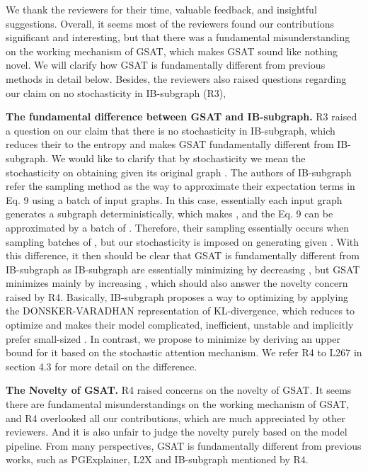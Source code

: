 \documentclass{article}
\begin{document}
\newpage
We thank the reviewers for their time, valuable feedback, and insightful suggestions. Overall, it seems most of the reviewers found our contributions significant and interesting, but that there was a fundamental misunderstanding on the working mechanism of GSAT, which makes GSAT sound like nothing novel. We will clarify how GSAT is fundamentally different from previous methods in detail below. Besides, the reviewers also raised questions regarding our claim on no stochasticity in IB-subgraph (R3), 

\textbf{The fundamental difference between GSAT and IB-subgraph.} R3 raised a question on our claim that there is no stochasticity in IB-subgraph, which reduces their  to the entropy  and makes GSAT fundamentally different from IB-subgraph. We would like to clarify that by stochasticity we mean the stochasticity on obtaining  given its original graph . The authors of IB-subgraph refer the sampling method as the way to approximate their expectation terms in Eq. 9 using a batch of input graphs. In this case, essentially each input graph   generates a subgraph  deterministically, which makes , and the Eq. 9 can be approximated by a batch of . Therefore, their sampling essentially occurs when sampling batches of , but our stochasticity is imposed on generating  given . With this difference, it then should be clear that GSAT is fundamentally different from IB-subgraph as IB-subgraph are essentially minimizing  by decreasing , but GSAT minimizes  mainly by increasing , which should also answer the novelty concern raised by R4. Basically, IB-subgraph proposes a way to optimizing  by applying the DONSKER-VARADHAN representation of KL-divergence, which reduces to optimize  and makes their model complicated, inefficient, unstable and implicitly prefer small-sized . In contrast, we propose to minimize  by deriving an upper bound for it based on the stochastic attention mechanism. We refer R4 to L267 in section 4.3 for more detail on the difference.

\textbf{The Novelty of GSAT.} R4 raised concerns on the novelty of GSAT. It seems there are fundamental misunderstandings on the working mechanism of GSAT, and R4 overlooked all our contributions, which are much appreciated by other reviewers. And it is also unfair to judge the novelty purely based on the model pipeline. From many perspectives, GSAT is fundamentally different from previous works, such as PGExplainer, L2X and IB-subgraph mentioned by R4. 
\end{document}
